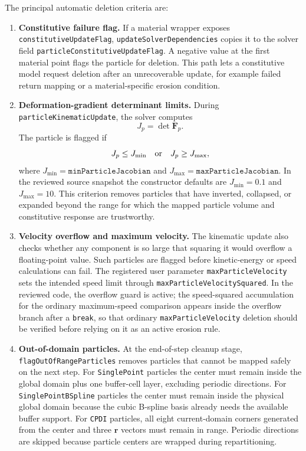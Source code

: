 The principal automatic deletion criteria are:
\begin{enumerate}
  \item \textbf{Constitutive failure flag.}  If a material wrapper exposes \texttt{constitutiveUpdateFlag}, \texttt{updateSolverDependencies} copies it to the solver field \texttt{particleConstitutiveUpdateFlag}.  A negative value at the first material point flags the particle for deletion.  This path lets a constitutive model request deletion after an unrecoverable update, for example failed return mapping or a material-specific erosion condition.
  \item \textbf{Deformation-gradient determinant limits.}  During \texttt{particleKinematicUpdate}, the solver computes
  \begin{equation}
    J_p = \det \mathbf{F}_p.
  \end{equation}
  The particle is flagged if
  \begin{equation}
    J_p \le J_{\min}\quad\hbox{or}\quad J_p \ge J_{\max},
    \label{eq:robust-j-deletion}
  \end{equation}
  where $J_{\min}=\texttt{minParticleJacobian}$ and $J_{\max}=\texttt{maxParticleJacobian}$.  In the reviewed source snapshot the constructor defaults are $J_{\min}=0.1$ and $J_{\max}=10$.  This criterion removes particles that have inverted, collapsed, or expanded beyond the range for which the mapped particle volume and constitutive response are trustworthy.
  \item \textbf{Velocity overflow and maximum velocity.}  The kinematic update also checks whether any component is so large that squaring it would overflow a floating-point value.  Such particles are flagged before kinetic-energy or speed calculations can fail.  The registered user parameter \texttt{maxParticleVelocity} sets the intended speed limit through \texttt{maxParticleVelocitySquared}.  In the reviewed code, the overflow guard is active; the speed-squared accumulation for the ordinary maximum-speed comparison appears inside the overflow branch after a \texttt{break}, so that ordinary \texttt{maxParticleVelocity} deletion should be verified before relying on it as an active erosion rule.
  \item \textbf{Out-of-domain particles.}  At the end-of-step cleanup stage, \texttt{flagOutOfRangeParticles} removes particles that cannot be mapped safely on the next step.  For \texttt{SinglePoint} particles the center must remain inside the global domain plus one buffer-cell layer, excluding periodic directions.  For \texttt{SinglePointBSpline} particles the center must remain inside the physical global domain because the cubic B-spline basis already needs the available buffer support.  For \texttt{CPDI} particles, all eight current-domain corners generated from the center and three $\mathbf{r}$ vectors must remain in range.  Periodic directions are skipped because particle centers are wrapped during repartitioning.

\end{enumerate}
